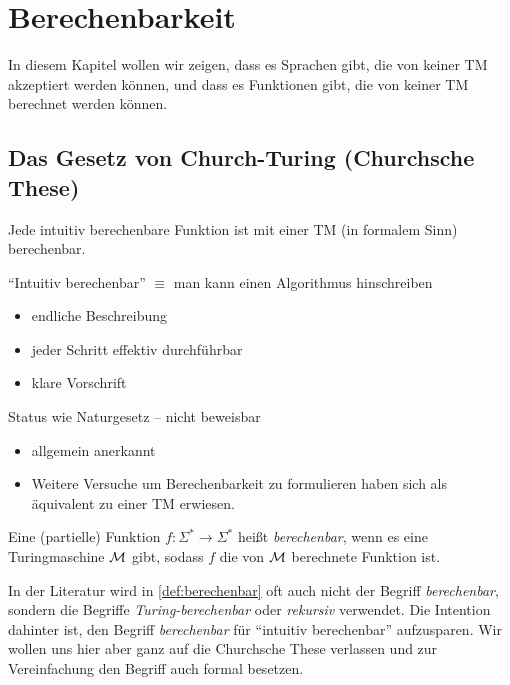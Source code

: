 \section[Berechenbarkeit]{Berechenbarkeit}



In diesem Kapitel wollen wir zeigen, 
dass es Sprachen gibt, die von keiner \ac{TM} akzeptiert werden können, und
dass es Funktionen gibt, die von keiner \ac{TM} berechnet werden können.


\subsection{Das Gesetz von Church-Turing (Churchsche These)} %
\begin{These*}[name={[Intuitiv berechenbare Funktionen sind mit \acs*{TM} berechenbar]}]
	Jede intuitiv berechenbare Funktion ist mit einer \ac{TM} (in formalem Sinn) berechenbar.
	
	{\color{gray}
	"`Intuitiv berechenbar"' $\equiv$ man kann einen Algorithmus hinschreiben
	\begin{itemize}
		\item endliche Beschreibung
		\item jeder Schritt effektiv durchführbar
		\item klare Vorschrift
	\end{itemize}
	Status wie Naturgesetz -- nicht beweisbar
	\begin{itemize}[label=\->]
		\item allgemein anerkannt
		\item Weitere Versuche um Berechenbarkeit zu formulieren haben sich als äquivalent zu einer \ac{TM} erwiesen.
	\qedhere
	\end{itemize}
	}
\end{These*}

\begin{Def}\label{def:berechenbar}
 Eine (partielle) Funktion $f:\Sigma^*\rightarrow\Sigma^*$ heißt \emph{berechenbar}, wenn es eine Turingmaschine $\mathcal{M}$ gibt,
 sodass $f$ die von $\mathcal{M}$ berechnete Funktion ist.
\end{Def}
\begin{Bemerkung}
 In der Literatur wird in \autoref{def:berechenbar} oft auch nicht der Begriff \emph{berechenbar}, sondern die Begriffe \emph{Turing-berechenbar} oder \emph{rekursiv} verwendet.
 Die Intention dahinter ist, den Begriff \emph{berechenbar} für "`intuitiv berechenbar"' aufzusparen.
 Wir wollen uns hier aber ganz auf die Churchsche These verlassen und zur Vereinfachung den Begriff auch formal besetzen.
\end{Bemerkung}





